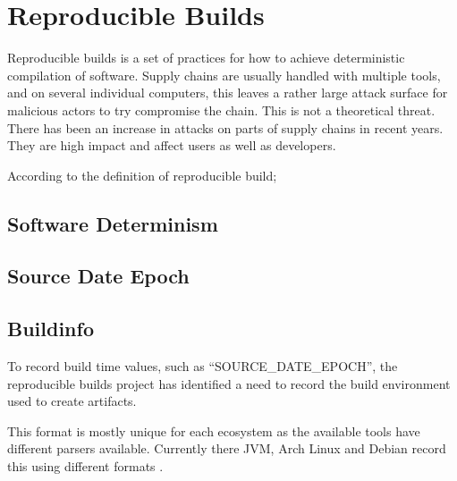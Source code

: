 \documentclass[../Main/thesis.tex]{subfiles}
\begin{document}
\section{Reproducible Builds}\label{sec:reproducible_builds}

    Reproducible builds is a set of practices for how to achieve deterministic
    compilation of software. Supply chains are usually handled with multiple
    tools, and on several individual computers, this leaves a rather large
    attack surface for malicious actors to try compromise the chain. This is not
    a theoretical threat. There has been an increase in attacks on parts of
    supply chains in recent years. They are high impact and affect users as well
    as developers.

    According to the definition of reproducible build;

    \cite{reproducible-builds-2019-definitions}


    \subsection*{Software Determinism}


    \subsection*{Source Date Epoch}
    

    \subsection*{Buildinfo}
    To record build time values, such as ``SOURCE\_DATE\_EPOCH'', the
    reproducible builds project has identified a need to record the build
    environment used to create artifacts.
  
    
    This format is mostly unique for each ecosystem as the available tools have
    different parsers available. Currently there JVM, Arch Linux and Debian
    record this using different formats \cite{reproducible-builds-2019}.
\end{document}
